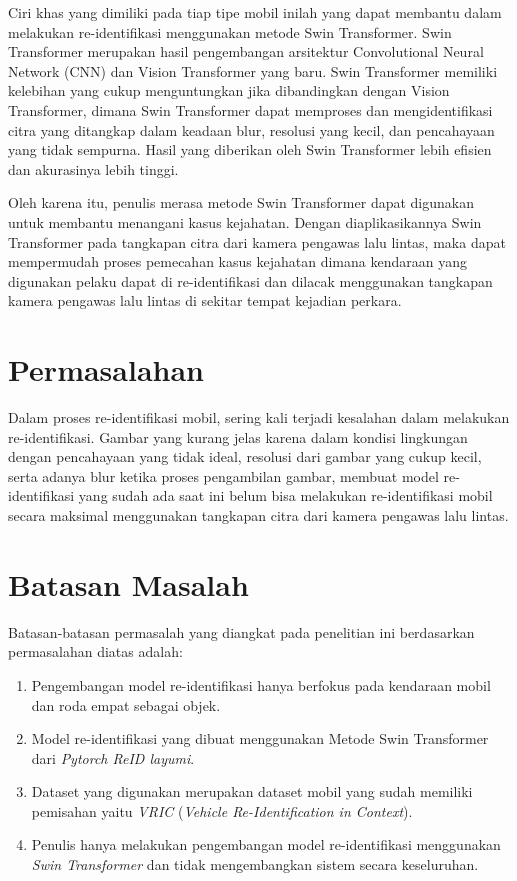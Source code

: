 Ciri khas yang dimiliki pada tiap tipe mobil inilah yang dapat membantu dalam melakukan 
re-identifikasi menggunakan metode Swin Transformer. Swin Transformer merupakan hasil 
pengembangan arsitektur Convolutional Neural Network (CNN) dan Vision Transformer yang 
baru. Swin Transformer memiliki kelebihan yang cukup menguntungkan jika dibandingkan 
dengan Vision Transformer, dimana Swin Transformer dapat memproses dan mengidentifikasi 
citra yang ditangkap dalam keadaan blur, resolusi yang kecil, dan pencahayaan yang tidak 
sempurna. Hasil yang diberikan oleh Swin Transformer lebih efisien dan akurasinya lebih tinggi.

Oleh karena itu, penulis merasa metode Swin Transformer dapat digunakan untuk membantu menangani 
kasus kejahatan. Dengan diaplikasikannya Swin Transformer pada tangkapan citra dari kamera pengawas 
lalu lintas, maka dapat mempermudah proses pemecahan kasus kejahatan dimana kendaraan yang digunakan 
pelaku dapat di re-identifikasi dan dilacak menggunakan tangkapan kamera pengawas lalu lintas di 
sekitar tempat kejadian perkara.

\section{Permasalahan}
\label{sec:permasalahan}

Dalam proses re-identifikasi mobil, sering kali terjadi kesalahan dalam melakukan re-identifikasi.
Gambar yang kurang jelas karena dalam kondisi lingkungan dengan pencahayaan yang tidak ideal,
resolusi dari gambar yang cukup kecil, serta adanya blur ketika proses pengambilan gambar, membuat model re-identifikasi
yang sudah ada saat ini belum bisa melakukan re-identifikasi mobil secara maksimal menggunakan 
tangkapan citra dari kamera pengawas lalu lintas.

\section{Batasan Masalah}
\label{sec:batasanmasalah}

Batasan-batasan permasalah yang diangkat pada penelitian ini berdasarkan permasalahan diatas adalah:

\begin{enumerate}[nolistsep]

      \item Pengembangan model re-identifikasi hanya berfokus pada kendaraan mobil dan roda empat sebagai objek.

      \item Model re-identifikasi yang dibuat menggunakan Metode Swin Transformer dari \emph{Pytorch 
      ReID layumi}.

      \item Dataset yang digunakan merupakan dataset mobil yang sudah memiliki pemisahan yaitu \emph{VRIC}
      (\emph{Vehicle Re-Identification in Context}).

      \item Penulis hanya melakukan pengembangan model re-identifikasi menggunakan \emph{Swin Transformer} dan tidak 
      mengembangkan sistem secara keseluruhan.

\end{enumerate}

